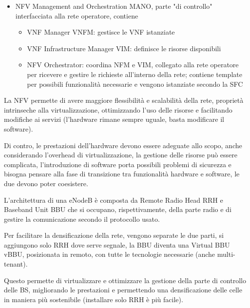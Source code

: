 \begin{questions}
\begin{solution}
\begin{itemize}
            \item NFV Management and Orchestration MANO, parte "di controllo" interfacciata alla rete operatore, contiene
            \begin{itemize}
                \item VNF Manager VNFM: gestisce le VNF istanziate
                
                \item VNF Infrastructure Manager VIM: definisce le risorse disponibili
                
                \item NFV Orchestrator: coordina NFM e VIM, collegato alla rete operatore per ricevere e gestire le richieste all'interno della rete; contiene template per possibili funzionalità necessarie e vengono istanziate secondo la SFC
            \end{itemize}
        \end{itemize}
        
        La NFV permette di avere maggiore flessibilità e scalabilità della rete, proprietà intrinseche alla virtualizzazione, ottimizzando l'uso delle risorse e facilitando modifiche ai servizi (l'hardware rimane sempre uguale, basta modificare il software).
        
        Di contro, le prestazioni dell'hardware devono essere adeguate allo scopo, anche considerando l'overhead di virtualizzazione, la gestione delle risorse può essere complicata, l'introduzione di software porta possibili problemi di sicurezza e bisogna pensare alla fase di transizione tra funzionalità hardware e software, le due devono poter coesistere.
        
        L'architettura di una eNodeB è composta da Remote Radio Head RRH e Baseband Unit BBU che si occupano, rispettivamente, della parte radio e di gestire la comunicazione secondo il protocollo usato.
        
        Per facilitare la densificazione della rete, vengono separate le due parti, si aggiungono solo RRH dove serve segnale, la BBU diventa una Virtual BBU vBBU, posizionata in remoto, con tutte le tecnologie necessarie (anche multi-tenant).
        
        Questo permette di virtualizzare e ottimizzare la gestione della parte di controllo delle BS, migliorando le prestazioni e permettendo una densificazione delle celle in maniera più sostenibile (installare solo RRH è più facile). 
    \end{solution}
    

\end{questions}

